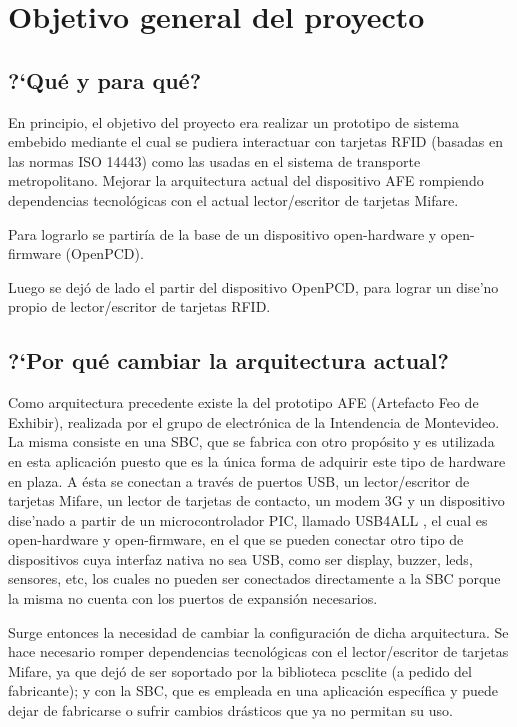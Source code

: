 \chapter{Objetivo general del proyecto}

\section{?`Qu\'e y para qu\'e?}

En principio, el objetivo del proyecto era realizar un prototipo de sistema embebido mediante el cual se pudiera interactuar con tarjetas RFID (basadas en las normas ISO 14443) como las usadas en el sistema de transporte metropolitano.
Mejorar la arquitectura actual del dispositivo AFE rompiendo dependencias tecnol\'ogicas con el actual lector/escritor de tarjetas Mifare.

Para lograrlo se partir\'ia de la base de un dispositivo open-hardware y open-firmware (OpenPCD).

Luego se dej\'o de lado el partir del dispositivo OpenPCD, para lograr un dise'no propio de lector/escritor de tarjetas RFID.

\section{?`Por qu\'e cambiar la arquitectura actual?}

Como arquitectura precedente existe la del prototipo AFE (Artefacto Feo de Exhibir), realizada por el grupo de electr\'onica de la Intendencia de Montevideo. La misma consiste en una SBC, que se fabrica con otro prop\'osito y es utilizada en esta aplicaci\'on puesto que es la \'unica forma de adquirir este tipo de hardware en plaza. A \'esta se conectan a trav\'es de puertos USB, un lector/escritor de tarjetas Mifare, un lector de tarjetas de contacto, un modem 3G y un dispositivo dise'nado a partir de un microcontrolador PIC, llamado USB4ALL \cite{usb4all}, el cual es open-hardware y open-firmware, en el que se pueden conectar otro tipo de dispositivos cuya interfaz nativa no sea USB, como ser display, buzzer, leds, sensores, etc, los cuales no pueden ser conectados directamente a la SBC porque la misma no cuenta con los puertos de expansi\'on necesarios.

Surge entonces la necesidad de cambiar la configuraci\'on de dicha arquitectura. Se hace necesario romper dependencias tecnol\'ogicas con el lector/escritor de tarjetas Mifare, ya que dej\'o de ser soportado por la biblioteca pcsclite \cite{pcsclite} (a pedido del fabricante); y con la SBC, que es empleada en una aplicaci\'on espec\'ifica y puede dejar de fabricarse o sufrir cambios dr\'asticos que ya no permitan su uso.


